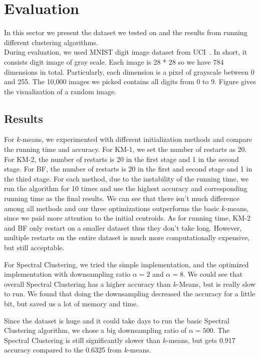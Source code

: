 \documentclass{acm_proc_article-sp}
\begin{document}
\section{Evaluation}
In this sector we present the dataset we tested on and the results from running different clustering algorithms.\\
During evaluation, we used MNIST digit image dataset from UCI~\cite{Lichman:2013}. In short, it consists digit image of gray scale. Each image is 28 * 28 so we have 784 dimensions in total. Particularly, each dimension is a pixel of grayscale between 0 and 255. The 10,000 images we picked contains all digits from 0 to 9. Figure gives the visualization of a random image.

\subsection{Results}
For $k$-means, we experimented with different initialization methods and compare the running time and accuracy. For KM-1, we set the number of restarts as 20. For KM-2, the number of restarts is 20 in the first stage and 1 in the second stage. For BF, the number of restarts is 20 in the first and second stage and 1 in the third stage. For each method, due to the instability of the running time, we run the algorithm for 10 times and use the highest accuracy and corresponding running time as the final results. We can see that there isn't much difference among all methods and our three optimizations outperforms the basic $k$-means, since we paid more attention to the initial centroids. As for running time, KM-2 and BF only restart on a smaller dataset thus they don't take long. However, multiple restarts on the entire dataset is much more computationally expensive, but still acceptable.

For Spectral Clustering, we tried the simple implementation, and the optimized implementation with downsampling ratio $\alpha=2$ and $\alpha=8$. We could see that overall Spectral Clustering has a higher accuracy than $k$-Means, but is really slow to run. We found that doing the downsampling decreased the accuracy for a little bit, but saved us a lot of memory and time.

Since the dataset is huge and it could take days to run the basic Spectral Clustering algorithm, we chose a big downsampling ratio of $\alpha = 500$. The Spectral Clustering is still significantly slower than $k$-means, but gets 0.917 accuracy compared to the 0.6325 from $k$-means.
\end{document}
